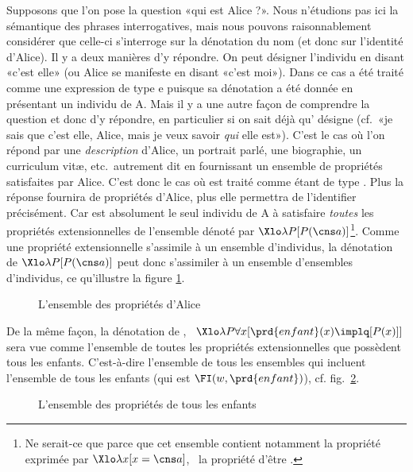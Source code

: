 Supposons que l'on pose la question «qui est Alice ?». Nous n'étudions pas ici la sémantique des phrases interrogatives, mais nous pouvons raisonnablement  considérer que celle-ci s'interroge sur la dénotation du nom  (et donc sur l'identité d'Alice).  Il y a deux manières d'y répondre.  On peut désigner l'individu  en disant «c'est elle» (ou Alice se manifeste en disant «c'est moi»). 
Dans ce cas  a été traité comme une expression de type \typ e puisque sa dénotation a été donnée en présentant un individu de \Unv A. 
Mais il y a une autre façon de comprendre la question et donc d'y répondre, en particulier si on sait déjà qu' désigne  (cf.\ «je sais que c'est elle, Alice, mais je veux savoir \emph{qui} elle est»). 
C'est le cas où l'on répond par une \emph{description} d'Alice, un portrait parlé, une biographie, un {curriculum vit\ae}, etc.\ autrement dit en fournissant un ensemble de propriétés satisfaites par Alice.
C'est donc le cas où  est traité comme étant de type \ett.  
Plus la réponse fournira de propriétés d'Alice, plus elle permettra de l'identifier précisément.
Car  est absolument le seul individu de \Unv A à satisfaire \emph{toutes} les propriétés extensionnelles de l'ensemble  dénoté par $\Xlo\lambda P[P(\cns a)]$\footnote{Ne serait-ce que parce que cet ensemble contient notamment la propriété exprimée par $\Xlo\lambda x[x=\cns a]$, \ie\ la propriété d'être .}.
Comme une propriété extensionnelle s'assimile à un ensemble d'individus, la dénotation de $\Xlo\lambda P[P(\cns a)]$ peut donc s'assimiler à un ensemble d'ensembles d'individus, ce qu'illustre la figure \ref{f:QGA}.


\begin{figure}[h!]
\begin{center}
\scalebox{.8}{%
%
}
\end{center}
\caption{L'ensemble des propriétés d'Alice}\label{f:QGA} %
\end{figure}


De la même façon, la dénotation de , \ie\ \(\Xlo\lambda P\forall x [\prd{enfant}(x)\implq[P(x)]]\) sera vue comme l'ensemble de toutes les propriétés extensionnelles que possèdent tous les enfants.  C'est-à-dire l'ensemble de tous les ensembles qui incluent l'ensemble de tous les enfants (qui est $\FI(w,\prd{enfant})$), cf. fig.~\ref{f:QGAx}.


\begin{figure}[h!]
\begin{center}
\scalebox{.8}{%
%
}
\end{center}
\caption{L'ensemble des propriétés de tous les enfants}\label{f:QGAx} %
\end{figure}


